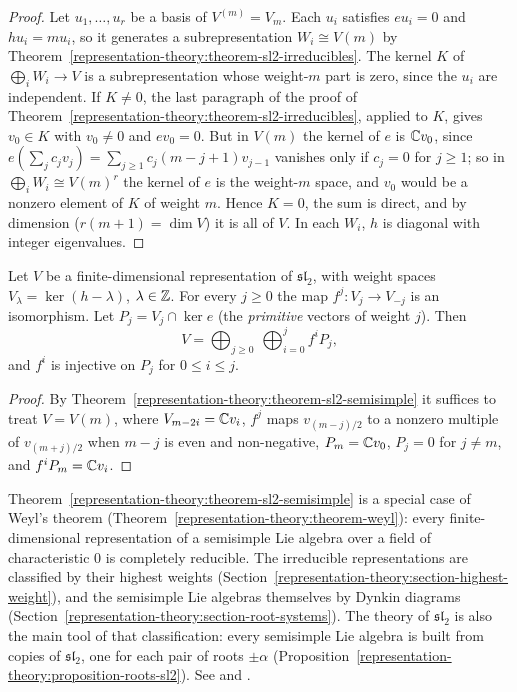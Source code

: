\begin{proof}
Let $u_1, \ldots, u_r$ be a basis of $V^{(m)} = V_m$. Each $u_i$ satisfies $eu_i = 0$ and $hu_i = mu_i$, so it generates a
subrepresentation $W_i \cong V(m)$ by Theorem~\ref{representation-theory:theorem-sl2-irreducibles}. The kernel $K$
of $\bigoplus_i W_i \to V$ is a subrepresentation whose weight-$m$ part is zero, since the $u_i$ are independent. If
$K \neq 0$, the last paragraph of the proof of Theorem~\ref{representation-theory:theorem-sl2-irreducibles},
applied to $K$, gives $v_0 \in K$ with $v_0 \neq 0$ and $ev_0 = 0$. But in $V(m)$ the kernel of $e$ is $\mathbb{C} v_0$, since
$e(\sum_j c_jv_j) = \sum_{j \geq 1} c_j(m - j + 1)v_{j-1}$ vanishes only if $c_j = 0$ for $j \geq 1$; so in
$\bigoplus_i W_i \cong V(m)^r$ the kernel of $e$ is the weight-$m$ space, and $v_0$ would be a nonzero element of
$K$ of weight $m$. Hence $K = 0$, the sum is direct, and by dimension ($r(m + 1) = \dim V$) it is all of $V$. In each
$W_i$, $h$ is diagonal with integer eigenvalues.
\end{proof}

\begin{corollary}\label{representation-theory:corollary-lefschetz-structure}
Let $V$ be a finite-dimensional representation of $\mathfrak{sl}_2$, with weight spaces $V_\lambda = \ker(h - \lambda)$,
$\lambda \in \mathbb{Z}$. For every $j \geq 0$ the map $f^j \colon V_j \to V_{-j}$ is an isomorphism. Let
$P_j = V_j \cap \ker e$ (the \emph{primitive} vectors of weight $j$). Then
\[
V = \bigoplus_{j \geq 0}\ \bigoplus_{i = 0}^{j} f^i P_j,
\]
and $f^i$ is injective on $P_j$ for $0 \leq i \leq j$.
\end{corollary}

\begin{proof}
By Theorem~\ref{representation-theory:theorem-sl2-semisimple} it suffices to treat $V = V(m)$, where
$V_{m - 2i} = \mathbb{C} v_i$, $f^j$ maps $v_{(m-j)/2}$ to a nonzero multiple of $v_{(m+j)/2}$ when $m - j$ is even and non-negative,
$P_m = \mathbb{C} v_0$, $P_j = 0$ for $j \neq m$, and $f^iP_m = \mathbb{C} v_i$.
\end{proof}

\begin{remark}\label{representation-theory:remark-semisimple-lie-algebras}
Theorem~\ref{representation-theory:theorem-sl2-semisimple} is a special case of Weyl's theorem
(Theorem~\ref{representation-theory:theorem-weyl}): every finite-dimensional representation of a semisimple Lie algebra over a field of characteristic $0$ is completely
reducible. The irreducible representations are classified by their highest weights (Section~\ref{representation-theory:section-highest-weight}), and the semisimple Lie
algebras themselves by Dynkin diagrams (Section~\ref{representation-theory:section-root-systems}). The theory of $\mathfrak{sl}_2$ is also the main tool of that
classification: every semisimple Lie algebra is built from copies of $\mathfrak{sl}_2$, one for each pair of roots $\pm\alpha$
(Proposition~\ref{representation-theory:proposition-roots-sl2}). See \cite{humphreys-lie} and \cite{fulton-harris}.
\end{remark}



